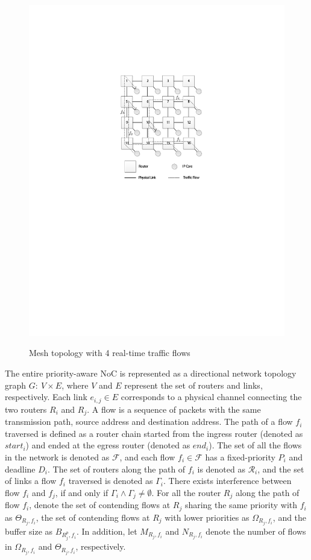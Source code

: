 \documentclass[10pt,journal]{IEEEtran}
\begin{document}
\begin{figure}
  \centering
  \includegraphics[scale=0.9]{figures/mesh.pdf}\\
  \caption{Mesh topology with 4 real-time traffic flows}\label{topology}
\end{figure}

The entire priority-aware NoC is represented as a directional network topology graph $G:\ V\times E$, where $V$ and $E$ represent the set of routers and links, respectively. Each link $e_{i,j}\in E$ corresponds to a physical channel connecting the two routers $R_i$ and $R_j$. A flow is a sequence of packets with the same transmission path, source address and destination address. The path of a flow $f_i$ traversed is defined as a router chain started from the ingress router (denoted as $start_i$) and ended at the egress router (denoted as $end_i$). The set of all the flows in the network is denoted as $\mathcal{F}$, and each flow $f_i\in\mathcal{F}$ has a fixed-priority $P_i$ and deadline $D_i$. The set of routers along the path of $f_i$ is denoted as $\mathcal{R}_i$, and the set of links a flow $f_i$ traversed is denoted as $\Gamma_i$. There exists interference between flow $f_i$ and $f_j$, if and only if $\Gamma_i\wedge\Gamma_j\neq\emptyset$. For all the router $R_j$ along the path of flow $f_i$, denote the set of contending flows at $R_j$ sharing the same priority with $f_i$ as $\Theta_{R_j,f_i}$, the set of contending flows at $R_j$ with lower priorities as $\Omega_{R_j,f_i}$, and the buffer size as $B_{R_j^{p},f_i}$. In addition, let $M_{R_j,f_i}$ and $N_{R_j,f_i}$ denote the number of flows in $\Omega_{R_j,f_i}$ and $\Theta_{R_j,f_i}$, respectively.
\end{document}
